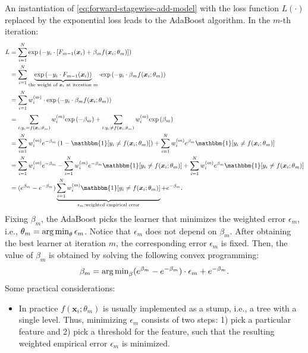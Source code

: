     
         An instantiation of \eqref{eq:forward-stagewise-add-model} with the loss function $L(\cdot)$ replaced by the exponential loss leads to the AdaBoost algorithm.
        In the $m$-th iteration:
            \begin{equation}
                \begin{aligned}
                    L & = \sum_{i=1}^{\ndata}{ \EXP{ - y_i \cdot \left[F_{m-1}(\bm{x}_i) + \beta_m f(\bm{x}_i; \theta_m) \right] } }\\
                      & = \sum_{i=1}^{\ndata}{\underbrace{\EXP{-y_i \cdot F_{m-1}(\bm{x}_i)}}_{\text{the weight of $\bm{x}_i$ at iteration $m$}} \cdot \EXP{-y_i \cdot \beta_m f(\bm{x}_i; \theta_m)} }\\
                      & = \sum_{i=1}^{\ndata}{w_i^{(m)} \cdot \EXP{-y_i \cdot \beta_m f(\bm{x}_i; \theta_m)}} \\
                      & = \sum_{i:y_i = f(\bm{x}_i;\theta_m)}^{}{w_i^{(m)} \EXP{-\beta_m}} + \sum_{i:y_i \ne f(\bm{x}_i;\theta_m)}^{}{w_i^{(m)} \EXP{\beta_m}} \\
                      & = \sum_{i=1}^{\ndata}{w^{(m)}_i e^{-\beta_m} \left( 1- \mathbbm{1}[y_i \ne f(\bm{x}_i; \theta_m)] \right)} + \sum_{i=1}^{\ndata}{w^{(m)}_i e^{\beta_m} \mathbbm{1}[y_i \ne f(\bm{x}_i; \theta_m)]} \\
                      & = \sum_{i=1}^{\ndata}{w^{(m)}_i e^{-\beta_m}} - \sum_{i=1}^{\ndata}{w^{(m)}_i e^{-\beta_m} \mathbbm{1}[y_i \ne f(\bm{x}_i; \theta_m)]} + \sum_{i=1}^{\ndata}{w^{(m)}_i e^{\beta_m} \mathbbm{1}[y_i \ne f(\bm{x}_i; \theta_m)]} \\
                      & = (e^{\beta_m} - e^{-\beta_m}) \underbrace{\sum_{i=1}^{\ndata}{w^{(m)}_i \mathbbm{1}[y_i \ne f(\bm{x}_i; \theta_m)]}}_{\epsilon_m: \text{weighted empirical error}} + e^{-\beta_m}.
                \end{aligned}
            \end{equation}
        Fixing $\beta_m$, the AdaBoost picks the learner that minimizes the weighted error $\epsilon_m$, i.e., $\theta_m = \operatorname{arg\,min}_{\theta} \epsilon_m$.
        Notice that $\epsilon_m$ does not depend on $\beta_m$.
        After obtaining the best learner at iteration $m$, the corresponding error $\epsilon_m$ is fixed.
        Then, the value of $\beta_m$ is obtained by solving the following convex programming:
        \begin{equation}
            \beta_m = \operatorname{arg\,min}_{\beta} (e^{\beta_m} - e^{-\beta_m}) \cdot \epsilon_m + e^{-\beta_m}.
        \end{equation}
         Some practical considerations:
        \begin{itemize}
            \item In practice $f(\bm{x}_i; \theta_m)$ is usually implemented as a stump, i.e., a tree with a single level.
            Thus, minimizing $\epsilon_m$ consists of two steps: 1) pick a particular feature and 2) pick a threshold for the feature, such that the resulting weighted empirical error $\epsilon_m$ is minimized.
        \end{itemize}
        
